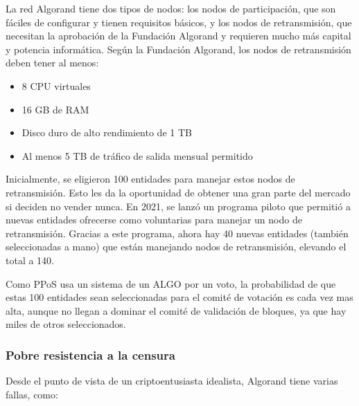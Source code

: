 \documentclass{article}
\begin{document}
La red Algorand tiene dos tipos de nodos: los nodos de participación, que son fáciles de configurar y tienen requisitos básicos, y los nodos de retransmisión, que necesitan la aprobación de la Fundación Algorand y requieren mucho más capital y potencia informática. Según la Fundación Algorand, los nodos de retransmisión deben tener al menos:

\begin{itemize}
    \item 8 CPU virtuales
\end{itemize}
\begin{itemize}
    \item 16 GB de RAM
\end{itemize}
\begin{itemize}
    \item Disco duro de alto rendimiento de 1 TB
\end{itemize}
\begin{itemize}
    \item Al menos 5 TB de tráfico de salida mensual permitido
\end{itemize}

Inicialmente, se eligieron 100 entidades para manejar estos nodos de retransmisión. Esto les da la oportunidad de obtener una gran parte del mercado si deciden no vender nunca. En 2021, se lanzó un programa piloto que permitió a nuevas entidades ofrecerse como voluntarias para manejar un nodo de retransmisión. Gracias a este programa, ahora hay 40 nuevas entidades (también seleccionadas a mano) que están manejando nodos de retransmisión, elevando el total a 140.

Como PPoS usa un sistema de un ALGO por un voto, la probabilidad de que estas 100 entidades sean seleccionadas para el comité de votación es cada vez mas alta, aunque no llegan a dominar el comité de validación de bloques, ya que hay miles de otros seleccionados.

\subsubsection{Pobre resistencia a la censura}

Desde el punto de vista de un criptoentusiasta idealista, Algorand tiene varias fallas, como:
\end{document}
